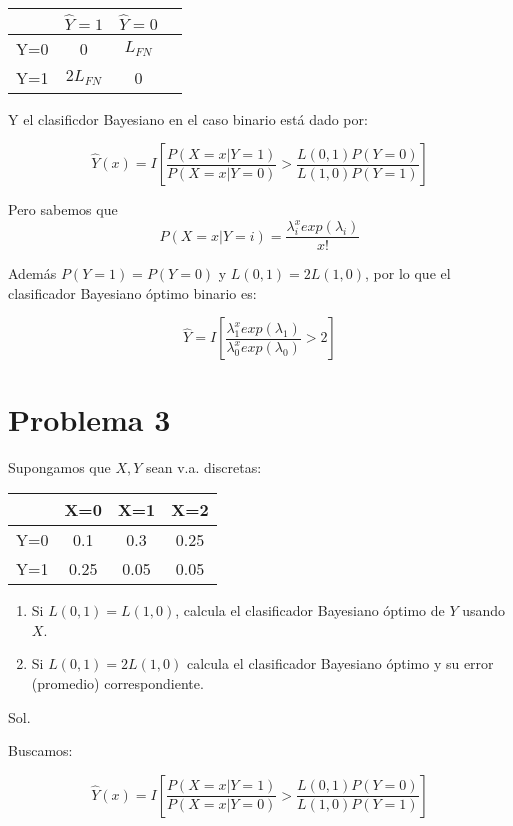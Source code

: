 \documentclass[letter, 11pt, twoside]{report}
\begin{document}
\begin{tabular}{c|ccc}
    & $\hat{Y}=1$ & $\hat{Y}=0 $  \\ \hline
   Y=0 & 0 & $L_{FN}$ \\
   Y=1  & $2L_{FN}$ & 0 \\
\end{tabular}

Y el clasificdor Bayesiano en el caso binario está dado por: 

\begin{equation}
    \hat{Y}(x)=I\left[\frac{P(X=x|Y=1)}{P(X=x|Y=0)}>\frac{L(0,1)P(Y=0)}{L(1,0)P(Y=1)}\right]
\end{equation}
 

Pero sabemos que $$P(X=x|Y=i)=\frac{\lambda_{i}^x exp(\lambda_i)}{x!}$$

Además $P(Y=1)=P(Y=0)$ y $L(0,1)=2L(1,0)$, por lo que el clasificador Bayesiano óptimo binario es: 


\begin{equation}
    \hat{Y}=I\left[\frac{\lambda_{1}^x exp(\lambda_1)}{\lambda_{0}^x exp(\lambda_0)}>2\right]
\end{equation}


{\color{mirosa}\section*{Problema 3}}

Supongamos que $X,Y$ sean v.a. discretas:

\begin{tabular}{c|ccc}
 & X=0 & X=1 & X=2  \\ \hline
Y=0 & 0.1 & 0.3 & 0.25\\
Y=1  & 0.25 & 0.05 & 0.05\\
\end{tabular}

\begin{enumerate}
    \item Si $L(0,1)=L(1,0)$, calcula el clasificador Bayesiano \'optimo de $Y$ usando $X$.
    \item Si $L(0,1)=2L(1,0)$ calcula el clasificador Bayesiano \'optimo y su error (promedio) correspondiente.
\end{enumerate} 

{\color{mirosa}Sol.}

Buscamos:

\begin{equation}
    \hat{Y}(x)=I\left[\frac{P(X=x|Y=1)}{P(X=x|Y=0)}>\frac{L(0,1)P(Y=0)}{L(1,0)P(Y=1)}\right]
\end{equation}
\end{document}
